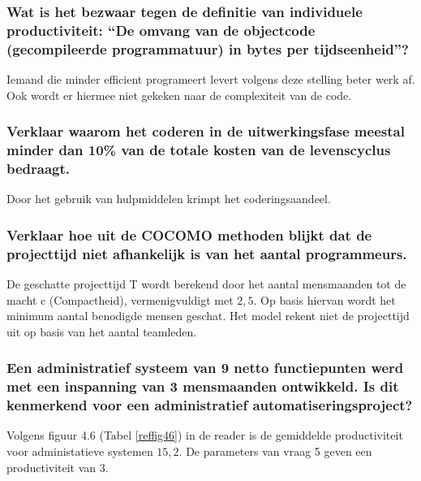 \documentclass[a4paper,titlepage]{artikel1}
\begin{document}
   \subsubsection[Opdracht 2]{Wat is het bezwaar tegen de definitie van
   individuele productiviteit: ``De omvang van de objectcode
   (gecompileerde programmatuur) in bytes per tijdseenheid''?}
   Iemand die minder efficient programeert levert volgens deze stelling beter werk af. Ook wordt er hiermee niet gekeken naar de complexiteit van de code.
   
   \subsubsection[Opdracht 3]{Verklaar waarom het coderen in de
   uitwerkingsfase meestal minder dan 10\% van de totale kosten van de levenscyclus bedraagt.}
   Door het gebruik van hulpmiddelen krimpt het coderingsaandeel.
   
   \subsubsection[Opdracht 4]{Verklaar hoe uit de COCOMO methoden blijkt dat de projecttijd niet afhankelijk is van het aantal programmeurs.}
   De geschatte projecttijd T wordt berekend door het aantal mensmaanden tot de macht c (Compactheid), vermenigvuldigt met $2,5$. Op basis hiervan wordt het minimum aantal benodigde mensen geschat. Het model rekent niet de projecttijd uit op basis van het aantal teamleden.

   \subsubsection[Opdracht 5]{Een administratief systeem van 9 netto
   functiepunten werd met een inspanning van 3 mensmaanden
   ontwikkeld. Is dit kenmerkend voor een administratief
   automatiseringsproject?}
   Volgens figuur 4.6 (Tabel \ref{reffig46}) in de reader is de gemiddelde productiviteit voor administatieve systemen $15,2$. De parameters van vraag 5 geven een productiviteit van $3$.
\end{document}

